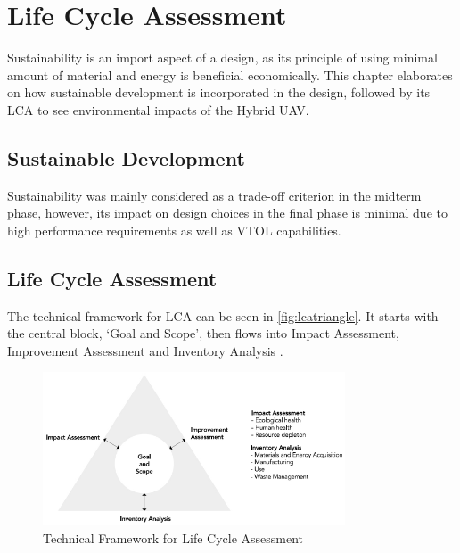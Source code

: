 \chapter{Life Cycle Assessment} 
\setlength{\parindent}{15pt}
\label{ch:susdevlca}

Sustainability is an import aspect of a design, as its principle of using minimal amount of material and energy is beneficial economically. This chapter elaborates on how sustainable development is incorporated in the design, followed by its LCA to see environmental impacts of the Hybrid UAV. 

\section{Sustainable Development}

Sustainability was mainly considered as a trade-off criterion in the midterm phase, however, its impact on design choices in the final phase is minimal due to high performance requirements as well as VTOL capabilities. 



\section{Life Cycle Assessment}

The technical framework for LCA can be seen in \autoref{fig:lcatriangle}. It starts with the central block, `Goal and Scope', then flows into Impact Assessment, Improvement Assessment and Inventory Analysis \cite{lca}.

\begin{figure}[H]
    \centering
    \includegraphics[width=0.8\textwidth]{LifeCycleAssessment/Figures/LCAtriangle.pdf}
    \caption{Technical Framework for Life Cycle Assessment}
    \label{fig:lcatriangle}
\end{figure}

